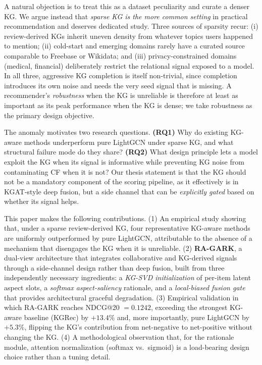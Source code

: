 \documentclass[12pt,a4paper]{article}
\begin{document}
A natural objection is to treat this as a dataset peculiarity and curate a denser KG. We argue instead that \emph{sparse KG is the more common setting} in practical recommendation and deserves dedicated study. Three sources of sparsity recur: (i) review-derived KGs inherit uneven density from whatever topics users happened to mention; (ii) cold-start and emerging domains rarely have a curated source comparable to Freebase or Wikidata; and (iii) privacy-constrained domains (medical, financial) deliberately restrict the relational signal exposed to a model. In all three, aggressive KG completion is itself non-trivial, since completion introduces its own noise and needs the very seed signal that is missing. A recommender's \emph{robustness} when the KG is unreliable is therefore at least as important as its peak performance when the KG is dense; we take robustness as the primary design objective.

The anomaly motivates two research questions. \textbf{(RQ1)} Why do existing KG-aware methods underperform pure LightGCN under sparse KG, and what structural failure mode do they share? \textbf{(RQ2)} What design principle lets a model exploit the KG when its signal is informative while preventing KG noise from contaminating CF when it is not? Our thesis statement is that the KG should not be a mandatory component of the scoring pipeline, as it effectively is in KGAT-style deep fusion, but a side channel that can be \emph{explicitly gated} based on whether its signal helps.

This paper makes the following contributions. (1) An empirical study showing that, under a sparse review-derived KG, four representative KG-aware methods are uniformly outperformed by pure LightGCN, attributable to the absence of a mechanism that disengages the KG when it is unreliable. (2) \textbf{RA-GARK}, a dual-view architecture that integrates collaborative and KG-derived signals through a side-channel design rather than deep fusion, built from three independently necessary ingredients: a \emph{KG-SVD initialization} of per-item latent aspect slots, a \emph{softmax aspect-saliency} rationale, and a \emph{local-biased fusion gate} that provides architectural graceful degradation. (3) Empirical validation in which RA-GARK reaches NDCG@20 $=0.1242$, exceeding the strongest KG-aware baseline (KGRec) by $+13.4\%$ and, more importantly, pure LightGCN by $+5.3\%$, flipping the KG's contribution from net-negative to net-positive without changing the KG. (4) A methodological observation that, for the rationale module, attention normalization (softmax vs.\ sigmoid) is a load-bearing design choice rather than a tuning detail.
\end{document}
